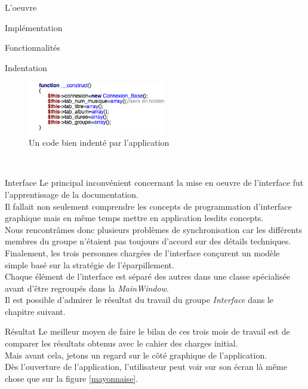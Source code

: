 \documentclass[a4paper, 12pt]{report}
\begin{document}
\begin{part}{L'oeuvre}
\begin{chapter}{Implémentation}
\begin{section}{Fonctionnalités}
\begin{subsection}{Indentation}
					\begin{figure}[h]
						\begin{center}
							\includegraphics[width=6cm]{images/indentBien.png}
							\caption{Un code bien indenté par l'application}
						\end{center}
					\end{figure}~\\
				\end{subsection}
			\end{section}
			\begin{section}{Interface}
				Le principal inconvénient concernant la mise en oeuvre de l'interface fut l'apprentissage de la documentation.\\
				Il fallait non seulement comprendre les concepts de programmation d'interface graphique mais en même temps mettre
				en application lesdits concepts.\\

				Nous rencontrâmes donc plusieurs problèmes de synchronisation car les différents membres du groupe n'étaient pas toujours
				d'accord sur des détails techniques.\\

				Finalement, les trois personnes chargées de l'interface conçurent un modèle simple basé sur la stratégie de l'éparpillement.\\
				Chaque élément de l'interface est séparé des autres dans une classe spécialisée avant d'être regroupés dans la \emph{MainWindow}.\\

				Il est possible d'admirer le résultat du travail du groupe \emph{Interface} dans le chapitre suivant.
			\end{section}
		\end{chapter}
		\begin{chapter}{Résultat}
			Le meilleur moyen de faire le bilan de ces trois mois de travail est de comparer les résultats obtenus avec le cahier des charges initial.\\
			Mais avant cela, jetons un regard sur le côté graphique de l'application.\\

			Dès l'ouverture de l'application, l'utilisateur peut voir sur son écran là même chose que sur la figure \ref{mayonnaise}.


\end{chapter}
\end{part}
\end{document}
